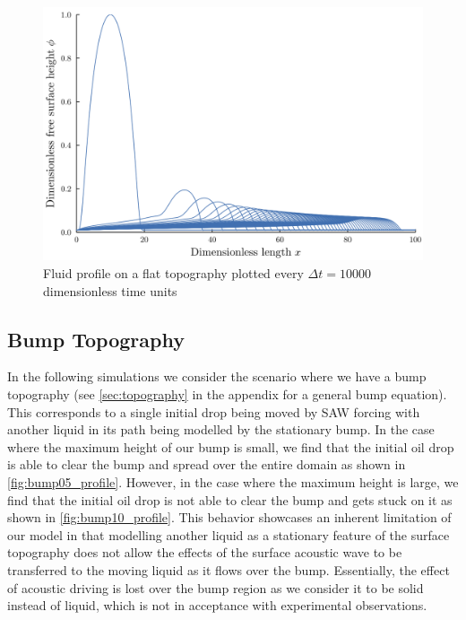 \begin{figure}[ht]
    \centering
    \includegraphics[scale=0.3]{images/flat/plt_notitle.png}
    \caption{Fluid profile on a flat topography plotted every $\Delta t = 10000$ dimensionless time units}
    \label{fig:flat_profile}
\end{figure}

\subsection{Bump Topography}
In the following simulations we consider the scenario where we have a bump topography (see \cref{sec:topography} in the appendix for 
a general bump equation). This corresponds to a single initial drop being moved by SAW forcing with 
another liquid in its path being modelled by the stationary bump.  
In the case where the maximum height of our bump is small, we find that the initial oil drop is able to 
clear the bump and spread over the entire domain as shown in \cref{fig:bump05_profile}. 
However, in the case where the maximum height is large, we find that the initial oil drop is not able to 
clear the bump and gets stuck on it as shown in \cref{fig:bump10_profile}. 
This behavior showcases an inherent limitation of our model in that modelling another liquid as a 
stationary feature of the surface topography does not allow the  effects of the surface acoustic wave
to be transferred to the moving liquid as it flows over the bump. Essentially, the effect of acoustic driving 
is lost over the bump region as we consider it to be solid instead of liquid, which is not in acceptance with experimental observations. 

